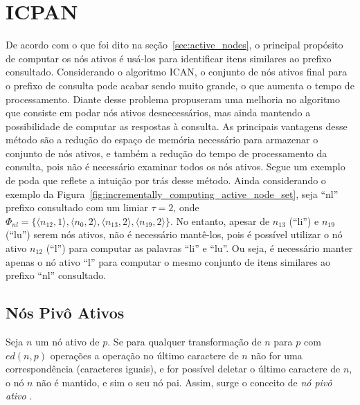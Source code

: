 \section{ICPAN}

De acordo com o que foi dito na seção~\ref{sec:active_nodes}, o principal propósito de computar os nós ativos é usá-los para identificar itens similares ao prefixo consultado. Considerando o algoritmo ICAN, o conjunto de nós ativos final para o prefixo de consulta pode acabar sendo muito grande, o que aumenta o tempo de processamento. Diante desse problema \cite{li2011efficient} propuseram uma melhoria no algoritmo que consiste em podar nós ativos desnecessários, mas ainda mantendo a possibilidade de computar as respostas à consulta. As principais vantagens desse método são a redução do espaço de memória necessário para armazenar o conjunto de nós ativos, e também a redução do tempo de processamento da consulta, pois não é necessário examinar todos os nós ativos. 
Segue um exemplo de poda que reflete a intuição por trás desse método. Ainda considerando o exemplo da Figura~\ref{fig:incrementally_computing_active_node_set}, seja ``nl'' prefixo consultado com um limiar $\tau = 2$, onde $\Phi_{nl} = \{ \langle n_{12}, 1\rangle, \langle n_{0}, 2\rangle,  \langle n_{13}, 2\rangle,  \langle n_{19}, 2\rangle \}$. No entanto, apesar de $n_{13}$ (``li'') e $n_{19}$ (``lu'') serem nós ativos, não é necessário mantê-los, pois é possível utilizar o nó ativo $n_{12}$ (``l'') para computar as palavras ``li'' e ``lu''. Ou seja, é necessário manter apenas o nó ativo ``l'' para computar o mesmo conjunto de itens similares ao prefixo ``nl'' consultado.

\subsection{Nós Pivô Ativos}
\label{sec:pivotal_active_nodes}

Seja $n$ um nó ativo de $p$. Se para qualquer transformação de $n$ para $p$ com $ed(n,p)$ operações a operação no último caractere de $n$ não for uma correspondência (caracteres iguais), e for possível deletar o último caractere de $n$, o nó $n$ não é mantido, e sim o seu nó pai. Assim, surge o conceito de \textit{nó pivô ativo} \citep{li2011efficient}.

